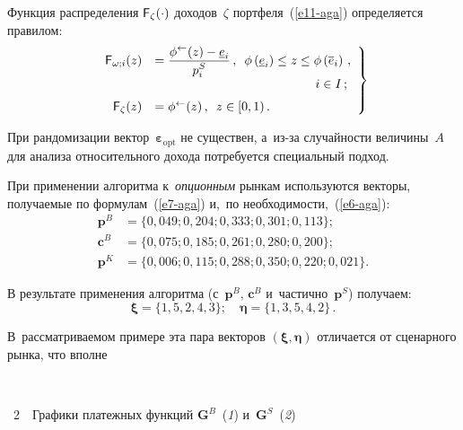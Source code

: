 \begin{multicols}{2}
  Функция распределения ${\sf F}_\zeta(\cdot)$ доходов~$\zeta$ 
портфеля~(\ref{e11-aga}) определяется правилом:
  \begin{equation}
  \left.
  \begin{array}{rl}
{\sf F}_{\omega;i}(z) &= \fr{\phi^\leftarrow (z)-\underline{e}_i}{p_i^S}\,,
  \enskip
  \phi\left( \underline{e}_i\right) \leq z\leq \phi\left( \overline{e}_i\right)\,,\\
  &\hspace*{45mm}
  i\in I\,;\\[6pt]
{\sf F}_\zeta(z)&=\phi^\leftarrow (z)\,,\enskip z\in [0,1)\,.
  \end{array}
  \right\}
  \label{e12-aga}
  \end{equation}
  
  При рандомизации вектор~$\boldsymbol{\varepsilon}_{\mathrm{opt}}$ не существен, 
а~из-за случайности величины~$A$ для анализа относительного дохода 
потребуется специальный подход. 
  
  При применении алгоритма к~\textit{опционным} рынкам используются 
векторы, получаемые по формулам~(\ref{e7-aga}) и,~по 
необходимости,~(\ref{e6-aga}): 
  \begin{align*}
  \boldsymbol{p}^B &= \{0{,}049; 0{,}204; 0{,}333; 0{,}301; 0{,}113\};\\
  \boldsymbol{c}^B &= \{0{,}075; 0{,}185; 0{,}261; 0{,}280; 0{,}200\};\\
  \boldsymbol{p}^K &= \{0{,}006; 0{,}115; 0{,}288; 0{,}350; 0{,}220; 0{,}021\}. 
  \end{align*}
  
  В результате применения алгоритма (с~$\boldsymbol{p}^B$, 
$\boldsymbol{c}^B$ и~частично~$\boldsymbol{p}^S$) получаем:
  $$
  \boldsymbol{\xi} = \{1, 5, 2, 4, 3\};\quad 
  \boldsymbol{\eta} = \{1, 3, 5, 4, 2\}\,. 
  $$
  
  В~рассматриваемом примере эта пара векторов $(\boldsymbol{\xi}, 
\boldsymbol{\eta})$ отличается от сценарного рынка, что вполне\linebreak\vspace*{-12pt}

 { \begin{center}  %
 \vspace*{-3pt}
 \mbox{%
 \epsfxsize=79mm 
 }


\vspace*{6pt}


\noindent
{{\figurename~2}\ \ \small{Графики платежных функций  $\boldsymbol{G}^B$~(\textit{1}) 
и~$\boldsymbol{G}^S$~(\textit{2})}}
\end{center}
}


\end{multicols}
